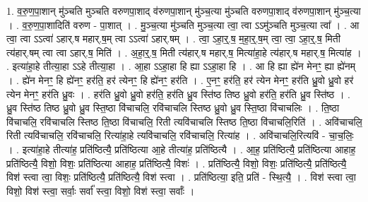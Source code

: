 \documentclass[17pt]{extarticle}
\begin{document}
1. व॒रु॒ण॒पा॒शान् मु॑ञ्चति मुञ्चति वरुणपा॒शाद् व॑रुणपा॒शान् मु॑ञ्च॒त्या मु॑ञ्चति वरुणपा॒शाद् व॑रुणपा॒शान् मु॑ञ्च॒त्या । . व॒रु॒ण॒पा॒शादिति॑ वरुण - पा॒शात् । . मु॒ञ्च॒त्या मु॑ञ्चति मुञ्च॒त्या त्वा॒ त्वा ऽऽमु॑ञ्चति मुञ्च॒त्या त्वा᳚ । . आ त्वा॒ त्वा ऽऽत्वा॑ ऽहार्.ष महार्.ष॒म् त्वा ऽऽत्वा॑ ऽहार्.षम् । . त्वा॒ ऽहा॒र्॒.ष॒ म॒हा॒र्॒.ष॒म् त्वा॒ त्वा॒ ऽहा॒र्॒.ष॒ मिती त्य॑हार्.षम् त्वा त्वा ऽहार्.ष॒ मिति॑ । . अ॒हा॒र्॒.ष॒ मिती त्य॑हार्.ष महार्.ष॒ मित्या॑हा॒हे त्य॑हार्.ष महार्.ष॒ मित्या॑ह । . इत्या॑हा॒हे तीत्या॒हा ऽऽहे तीत्या॒हा । . आ॒हा ऽऽहा॒हा हि ह्या ऽऽहा॒हा हि । . आ हि ह्या ह्ये॑न मेनꣳ॒॒ ह्या ह्ये॑नम् । . ह्ये॑न मेनꣳ॒॒ हि ह्ये॑नꣳ॒॒ हर॑ति॒ हर॑ त्येनꣳ॒॒ हि ह्ये॑नꣳ॒॒ हर॑ति । . ए॒नꣳ॒॒ हर॑ति॒ हर॑ त्येन मेनꣳ॒॒ हर॑ति ध्रु॒वो ध्रु॒वो हर॑ त्येन मेनꣳ॒॒ हर॑ति ध्रु॒वः । . हर॑ति ध्रु॒वो ध्रु॒वो हर॑ति॒ हर॑ति ध्रु॒व स्ति॑ष्ठ तिष्ठ ध्रु॒वो हर॑ति॒ हर॑ति ध्रु॒व स्ति॑ष्ठ । . ध्रु॒व स्ति॑ष्ठ तिष्ठ ध्रु॒वो ध्रु॒व स्ति॒ष्ठा वि॑चाचलि॒ रवि॑चाचलि स्तिष्ठ ध्रु॒वो ध्रु॒व स्ति॒ष्ठा वि॑चाचलिः । . ति॒ष्ठा वि॑चाचलि॒ रवि॑चाचलि स्तिष्ठ ति॒ष्ठा वि॑चाचलि॒ रिती त्यवि॑चाचलि स्तिष्ठ ति॒ष्ठा वि॑चाचलि॒रिति॑ । . अवि॑चाचलि॒ रिती त्यवि॑चाचलि॒ रवि॑चाचलि॒ रित्या॑हा॒हे त्यवि॑चाचलि॒ रवि॑चाचलि॒ रित्या॑ह । . अवि॑चाचलि॒रित्यवि॑ - चा॒च॒लिः॒ । . इत्या॑हा॒हे तीत्या॑ह॒ प्रति॑ष्ठित्यै॒ प्रति॑ष्ठित्या आ॒हे तीत्या॑ह॒ प्रति॑ष्ठित्यै । . आ॒ह॒ प्रति॑ष्ठित्यै॒ प्रति॑ष्ठित्या आहाह॒ प्रति॑ष्ठित्यै॒ विशो॒ विशः॒ प्रति॑ष्ठित्या आहाह॒ प्रति॑ष्ठित्यै॒ विशः॑ । . प्रति॑ष्ठित्यै॒ विशो॒ विशः॒ प्रति॑ष्ठित्यै॒ प्रति॑ष्ठित्यै॒ विश॑ स्त्वा त्वा॒ विशः॒ प्रति॑ष्ठित्यै॒ प्रति॑ष्ठित्यै॒ विश॑ स्त्वा । . प्रति॑ष्ठित्या॒ इति॒ प्रति॑ - स्थि॒त्यै॒ । . विश॑ स्त्वा त्वा॒ विशो॒ विश॑ स्त्वा॒ सर्वाः॒ सर्वा᳚ स्त्वा॒ विशो॒ विश॑ स्त्वा॒ सर्वाः᳚ । \newline
\end{document}
